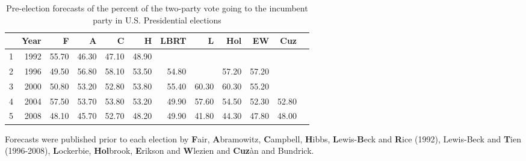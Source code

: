 \documentclass[12pt,fullpage,endnotes]{article}
\begin{document}
\begin{table}[ht]
\caption{Pre-election forecasts of the percent of the two-party vote going to the incumbent party in U.S. Presidential elections}
\label{tab:one}
\footnotesize
\begin{center}
\begin{tabular}{rrrrrrrrrrrr}
  \toprule
 & Year & F & A & C & H & LBRT & L & Hol & EW & Cuz  \\ 
  \midrule
1 & 1992 & 55.70 & 46.30 & 47.10 & 48.90 &  &  &  &  &   \\ 
  2 & 1996 & 49.50 & 56.80 & 58.10 & 53.50 & 54.80 &  & 57.20 & 57.20 &   \\ 
  3 & 2000 & 50.80 & 53.20 & 52.80 & 53.80 & 55.40 & 60.30 & 60.30 & 55.20 &   \\ 
  4 & 2004 & 57.50 & 53.70 & 53.80 & 53.20 & 49.90 & 57.60 & 54.50 & 52.30 & 52.80  \\ 
  5 & 2008 & 48.10 & 45.70 & 52.70 & 48.20 & 49.90 & 41.80 & 44.30 & 47.80 & 48.00  \\ 
   \bottomrule
%
\end{tabular}
\end{center}
Forecasts were published prior to each election by \textbf{F}air, \textbf{A}bramowitz, \textbf{C}ampbell, \textbf{H}ibbs, \textbf{L}ewis-\textbf{B}eck and \textbf{R}ice (1992), Lewis-Beck and \textbf{T}ien  (1996-2008),   \textbf{L}ockerbie, \textbf{Hol}brook, \textbf{E}rikson and \textbf{W}lezien and \textbf{Cuz}\`an and Bundrick. 
\end{table}
\end{document}
